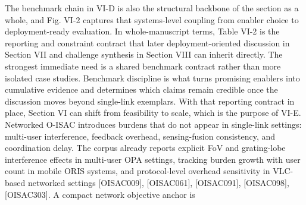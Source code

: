 {}The benchmark chain in VI-D is also the structural backbone of the section as a whole, and Fig. VI-2 captures that systems-level coupling from enabler choice to deployment-ready evaluation. In whole-manuscript terms, Table VI-2 is the reporting and constraint contract that later deployment-oriented discussion in Section VII and challenge synthesis in Section VIII can inherit directly.\markdownRendererParagraphSeparator
{}\markdownRendererParagraphSeparator
{} The strongest immediate need is a shared benchmark contract rather than more isolated case studies. Benchmark discipline is what turns promising enablers into cumulative evidence and determines which claims remain credible once the discussion moves beyond single-link exemplars. With that reporting contract in place, Section VI can shift from feasibility to scale, which is the purpose of VI-E.\markdownRendererInterblockSeparator
{}
\markdownRendererSectionEnd \markdownRendererSectionBegin
{}\markdownRendererInterblockSeparator
{}Networked O-ISAC introduces burdens that do not appear in single-link settings: multi-user interference, feedback overhead, sensing-fusion consistency, and coordination delay. The corpus already reports explicit FoV and grating-lobe interference effects in multi-user OPA settings, tracking burden growth with user count in mobile ORIS systems, and protocol-level overhead sensitivity in VLC-based networked settings [O\markdownRendererUnderscore{}ISAC\markdownRendererUnderscore{}009], [O\markdownRendererUnderscore{}ISAC\markdownRendererUnderscore{}061], [O\markdownRendererUnderscore{}ISAC\markdownRendererUnderscore{}091], [O\markdownRendererUnderscore{}ISAC\markdownRendererUnderscore{}098], [O\markdownRendererUnderscore{}ISAC\markdownRendererUnderscore{}303].\markdownRendererParagraphSeparator
{}A compact network objective anchor is\markdownRendererParagraphSeparator
{}\markdownRendererSoftLineBreak
